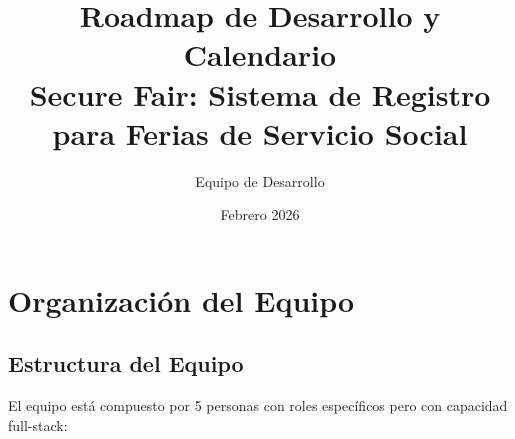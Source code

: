 \documentclass[12pt,a4paper]{article}
\title{\textbf{Roadmap de Desarrollo y Calendario}\\
\large Secure Fair: Sistema de Registro para Ferias de Servicio Social}
\author{Equipo de Desarrollo}
\date{Febrero 2026}
\begin{document}
\maketitle
\newpage

\tableofcontents
\newpage

\section{Organización del Equipo}

\subsection{Estructura del Equipo}

El equipo está compuesto por 5 personas con roles específicos pero con capacidad full-stack:
\end{document}
